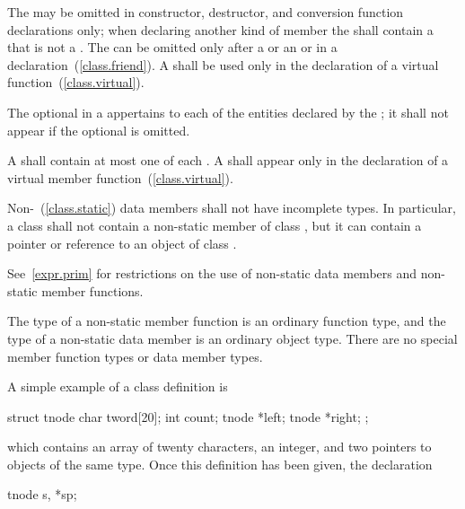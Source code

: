 \pnum
The  may be omitted in constructor, destructor,
and conversion function declarations only;
when declaring another kind of member the 
shall contain a  that is not a .
The
 can be omitted only after a
 or an  or in a
 declaration~(\ref{class.friend}). A
 shall be used only in the declaration of a
virtual function~(\ref{class.virtual}).

\pnum
The optional  in a 
appertains to each of the entities declared by the ;
it shall not appear if the optional  is omitted.

\pnum
A  shall contain at most one of each
.
A 
shall appear only in the declaration of a virtual member
function~(\ref{class.virtual}).

\pnum
{}%
Non-~(\ref{class.static}) data members shall not have
incomplete types. In particular, a class  shall not contain a
non-static member of class , but it can contain a pointer or
reference to an object of class .

\pnum
\enternote
See~\ref{expr.prim} for restrictions on the use of non-static data
members and non-static member functions.
\exitnote

\pnum
\enternote
The type of a non-static member function is an ordinary function type,
and the type of a non-static data member is an ordinary object type.
There are no special member function types or data member types.
\exitnote

\pnum
{}%
\enterexample
A simple example of a class definition is

\begin{codeblock}
struct tnode {
  char tword[20];
  int count;
  tnode *left;
  tnode *right;
};
\end{codeblock}

which contains an array of twenty characters, an integer, and two
pointers to objects of the same type. Once this definition has been
given, the declaration

\begin{codeblock}
tnode s, *sp;
\end{codeblock}

